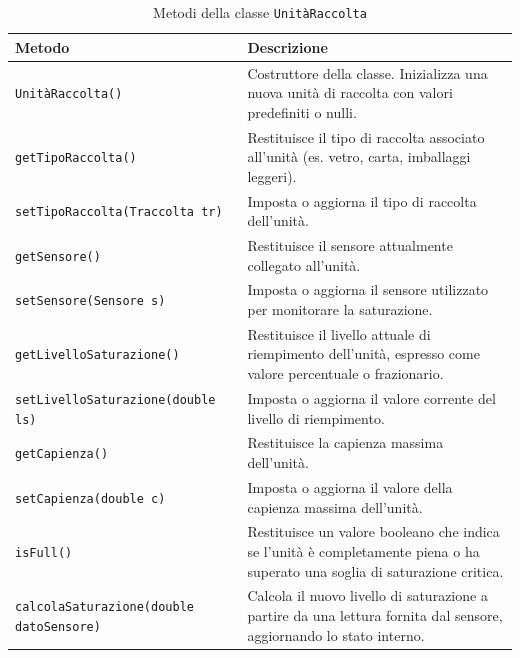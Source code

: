 \begin{table}[H]
\centering
\begin{tabularx}{\textwidth}{|l|X|}
\hline
\textbf{Metodo} & \textbf{Descrizione} \\
\hline
\texttt{UnitàRaccolta()} & Costruttore della classe. Inizializza una nuova unità di raccolta con valori predefiniti o nulli. \\
\hline
\texttt{getTipoRaccolta()} & Restituisce il tipo di raccolta associato all’unità (es. vetro, carta, imballaggi leggeri). \\
\hline
\texttt{setTipoRaccolta(Traccolta tr)} & Imposta o aggiorna il tipo di raccolta dell’unità. \\
\hline
\texttt{getSensore()} & Restituisce il sensore attualmente collegato all’unità. \\
\hline
\texttt{setSensore(Sensore s)} & Imposta o aggiorna il sensore utilizzato per monitorare la saturazione. \\
\hline
\texttt{getLivelloSaturazione()} & Restituisce il livello attuale di riempimento dell’unità, espresso come valore percentuale o frazionario. \\
\hline
\texttt{setLivelloSaturazione(double ls)} & Imposta o aggiorna il valore corrente del livello di riempimento. \\
\hline
\texttt{getCapienza()} & Restituisce la capienza massima dell’unità. \\
\hline
\texttt{setCapienza(double c)} & Imposta o aggiorna il valore della capienza massima dell’unità. \\
\hline
\texttt{isFull()} & Restituisce un valore booleano che indica se l’unità è completamente piena o ha superato una soglia di saturazione critica. \\
\hline
\texttt{calcolaSaturazione(double datoSensore)} & Calcola il nuovo livello di saturazione a partire da una lettura fornita dal sensore, aggiornando lo stato interno. \\
\hline
\end{tabularx}
\caption{Metodi della classe \texttt{UnitàRaccolta}}
\end{table}
